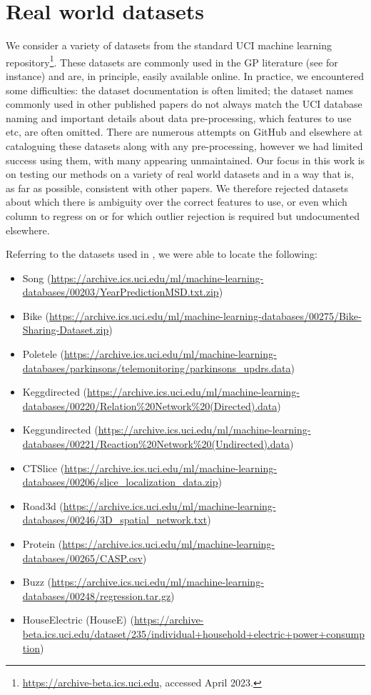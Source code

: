 \section{Real world datasets}\label{appx:real_world_data}
We consider a variety of datasets from the standard UCI machine learning repository\footnote{\url{https://archive-beta.ics.uci.edu}, accessed April 2023.}.
These datasets are commonly used in the GP literature (see \cite{Gard1} for instance) and are, in principle, easily available online.
In practice, we encountered some difficulties: the dataset documentation is often limited; the dataset names  commonly used in other published papers  do not always match the UCI database naming and important details about data pre-processing, which features to use etc, are often omitted.
There are numerous attempts on GitHub and elsewhere at cataloguing these datasets along with any pre-processing, however we had limited success using them, with many appearing unmaintained. 
Our focus in this work is on testing our methods on a variety of real world datasets and in a way that is, as far as possible, consistent with other papers. We therefore rejected datasets about which there is ambiguity over the correct features to use, or even which column to regress on or for which outlier rejection is required but undocumented elsewhere.

\medskip
Referring to the datasets used in \cite{Gard1}, we were able to locate the following: 
\begin{itemize}
    \item Song (\url{https://archive.ics.uci.edu/ml/machine-learning-databases/00203/YearPredictionMSD.txt.zip})
    \item Bike (\url{https://archive.ics.uci.edu/ml/machine-learning-databases/00275/Bike-Sharing-Dataset.zip})
    \item Poletele (\url{https://archive.ics.uci.edu/ml/machine-learning-databases/parkinsons/telemonitoring/parkinsons_updrs.data})
    \item Keggdirected (\url{https://archive.ics.uci.edu/ml/machine-learning-databases/00220/Relation\%20Network\%20(Directed).data})
    \item Keggundirected (\url{https://archive.ics.uci.edu/ml/machine-learning-databases/00221/Reaction\%20Network\%20(Undirected).data})
    \item CTSlice (\url{https://archive.ics.uci.edu/ml/machine-learning-databases/00206/slice_localization_data.zip})
    \item Road3d (\url{https://archive.ics.uci.edu/ml/machine-learning-databases/00246/3D_spatial_network.txt})
    \item Protein (\url{https://archive.ics.uci.edu/ml/machine-learning-databases/00265/CASP.csv})
    \item Buzz (\url{https://archive.ics.uci.edu/ml/machine-learning-databases/00248/regression.tar.gz})
    \item HouseElectric (HouseE) (\url{https://archive-beta.ics.uci.edu/dataset/235/individual+household+electric+power+consumption})
\end{itemize}

